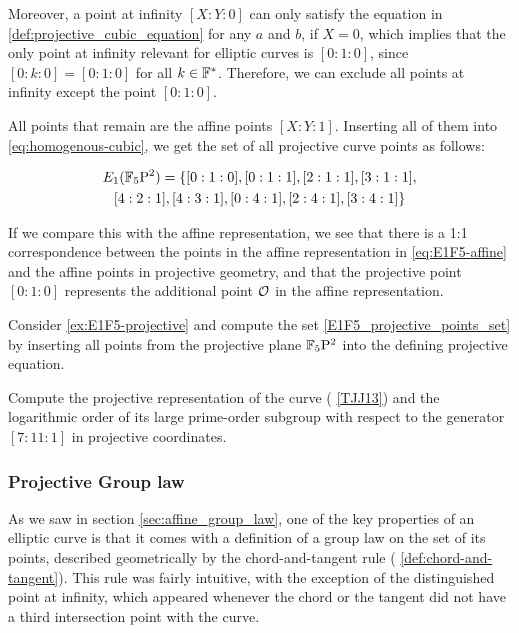 \begin{example}
Moreover, a point at infinity $[X:Y:0]$ can only satisfy the equation in \eqref{def:projective_cubic_equation} for any $a$ and $b$, if $X=0$, which implies that the only point at infinity relevant for  elliptic curves is $[0:1:0]$, since $[0:k:0]= [0:1:0]$ for all $k\in\mathbb{F}^*$. Therefore, we can exclude all points at infinity except the point $[0:1:0]$.

All points that remain are the affine points $[X:Y:1]$. Inserting all of them into \eqref{eq:homogenous-cubic}, we get the set of all projective curve points as follows:

\begin{multline}
\label{E1F5_projective_points_set}
E_1(\mathbb{F}_5\mathrm{P}^2)=\{[0:1:0], [0:1:1], [2:1:1], [3:1:1], \\ [4:2:1], [4:3:1], [0:4:1], [2:4:1], [3:4:1]\}
\end{multline}

If we compare this with the affine representation, we see that there is a 1:1 correspondence between the points in the affine representation in \eqref{eq:E1F5-affine} and the affine points in projective geometry, and that the projective point $[0:1:0]$ represents the additional point $\mathcal{O}$ in the affine representation.
\end{example} 

\begin{exercise}
Consider \examplename{} \ref{ex:E1F5-projective} and compute the set \eqref{E1F5_projective_points_set} by inserting all points from the projective plane $\mathbb{F}_5\mathrm{P}^2$ into the defining projective  equation.
\end{exercise}

\begin{exercise}
Compute the projective representation of the  curve (\examplename{} \ref{TJJ13}) and the logarithmic order of its large prime-order subgroup with respect to the generator $[7:11:1]$ in projective coordinates.
\end{exercise}

\subsubsection{Projective Group law}
\label{sec:projective_group_law}
As we saw in section \ref{sec:affine_group_law}, one of the key properties of an elliptic curve is that it comes with a definition of a group law on the set of its points, described geometrically by the chord-and-tangent rule ( \ref{def:chord-and-tangent}). This rule was fairly intuitive, with the exception of the distinguished point at infinity, which appeared whenever the chord or the tangent did not have a third intersection point with the curve.

